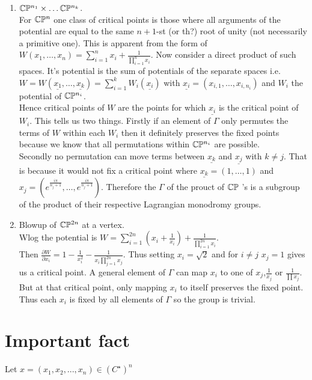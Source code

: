 \documentclass[a4paper]{article}
\begin{document}
\begin{enumerate}
   \item $\mathbb{C}\mathbb{P}^{n_1}\times \ldots \mathbb{C}\mathbb{P}^{n_{k}}$.\\
       For $\mathbb{C}\mathbb{P}^{n}$ one class of critical points is those where all arguments of the potential are equal to the same $n+1$-st (or th?) root of unity (not necessarily a primitive one). This is apparent from the form of $W(x_1, \ldots, x_n)=\sum_{i=1}^{n}x_{i}+\frac{1}{\prod_{i=1}^{n}x_{i}}$. Now consider a direct product of such spaces. It's potential is the sum of potentials of the separate spaces i.e. $W=W\left( \underline{x_1}, \ldots, \underline{x_{k}} \right) =\sum_{i=1}^{k} W_i(\underline{x_{i}})$ with $\underline{x_i}=\left( x_{i,1}, \ldots , x_{i,n_{i}} \right) $ and $W_i$ the potential of $\mathbb{C}\mathbb{P}^{n_{i}}$.\\
       Hence critical points of $W$ are the points for which $\underline{x_{i}}$ is the critical point of $W_{i}$. This tells us two things. Firstly if an element of $\Gamma$ only permutes the terms of $W$ within each $W_i$ then it definitely preserves the fixed points because we know that all permutations within  $\mathbb{C}\mathbb{P}^{n_i}$ are possible.\\
       Secondly no permutation can move terms between $\underline{x_{k}}$ and $ \underline{x_{j}}$ with $k\neq j$. That is because it would not fix a critical point where $\underline{x_k}=\left( 1, \ldots, 1 \right) $ and $x_{j}=\left( e^{\frac{i\pi}{n_j+1}}, \ldots, e^{\frac{i\pi}{n_j+1}}  \right) $. Therefore the $\Gamma$ of the prouct of $\mathbb{C}\mathbb{P}$ 's is a subgroup of the product of their respective Lagrangian monodromy groups.\\
   \item Blowup of $\mathbb{C}\mathbb{P}^{2n}$ at a vertex.\\
       Wlog the potential is $W=\sum_{i=1}^{2n}\left( x_{i} +\frac{1}{x_{i}}\right) +\frac{1}{\prod_{i=1}^{2n}x_{i}}$.\\
       Then $\frac{\partial W}{\partial x_{i}} =1-\frac{1}{x_{i}^2}-\frac{1}{x_{i}\prod_{j=1}^{2n}x_{j}}$. Thus setting $x_{i}=\sqrt{2} $ and for $i\neq j$ $x_{j}=1$ gives us a critical point. A general element of $\Gamma$ can map $x_{i}$ to one of $x_{j}$,$\frac{1}{x_{j}}$ or $\frac{1}{\prod x_{j}}$. But at that critical point, only mapping $x_{i}$ to itself preserves the fixed point. Thus each $x_{i}$ is fixed by all elements of $\Gamma$ so the group is trivial.
\end{enumerate} 
	\section{Important fact}
	Let $x = (x_1, x_2, ..., x_n) \in (C^{\star})^n$
	
\end{document}
